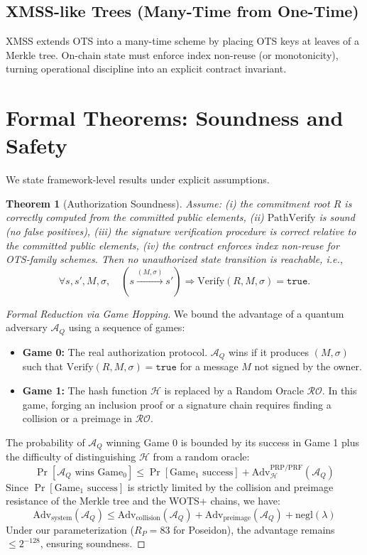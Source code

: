 \documentclass[conference]{IEEEtran}
\theoremstyle{definition}
\theoremstyle{plain}
\newtheorem{theorem}{Theorem}
\theoremstyle{remark}
\newcommand{\negl}{\mathrm{negl}}
\newcommand{\Verify}{\mathrm{Verify}}
\newcommand{\PathVerify}{\mathrm{PathVerify}}
\newcommand{\Hash}{\mathcal{H}}
\begin{document}
\subsection{XMSS-like Trees (Many-Time from One-Time)}
XMSS extends OTS into a many-time scheme by placing OTS keys at leaves of a Merkle tree. On-chain state must enforce index non-reuse (or monotonicity), turning operational discipline into an explicit contract invariant.

\section{Formal Theorems: Soundness and Safety}
We state framework-level results under explicit assumptions.

\begin{theorem}[Authorization Soundness]
\label{thm:soundness}
Assume:
(i) the commitment root $R$ is correctly computed from the committed public elements,
(ii) $\PathVerify$ is sound (no false positives),
(iii) the signature verification procedure is correct relative to the committed public elements,
(iv) the contract enforces index non-reuse for OTS-family schemes.
Then no unauthorized state transition is reachable, i.e.,
\[
\forall s,s',M,\sigma,\quad \left(s \xrightarrow{(M,\sigma)} s'\right)\Rightarrow \Verify(R,M,\sigma)=\texttt{true}.
\]
\end{theorem}

\begin{proof}[Formal Reduction via Game Hopping]
We bound the advantage of a quantum adversary $\mathcal{A}_Q$ using a sequence of games:
\begin{itemize}
    \item \textbf{Game 0:} The real authorization protocol. $\mathcal{A}_Q$ wins if it produces $(M, \sigma)$ such that $\Verify(R, M, \sigma) = \texttt{true}$ for a message $M$ not signed by the owner.
    \item \textbf{Game 1:} The hash function $\Hash$ is replaced by a Random Oracle $\mathcal{RO}$. In this game, forging an inclusion proof or a signature chain requires finding a collision or a preimage in $\mathcal{RO}$.
\end{itemize}
The probability of $\mathcal{A}_Q$ winning Game 0 is bounded by its success in Game 1 plus the difficulty of distinguishing $\Hash$ from a random oracle:
\[
\Pr[\mathcal{A}_Q \text{ wins } \text{Game}_0] \leq \Pr[\text{Game}_1 \text{ success}] + \text{Adv}_{\Hash}^{\text{PRP/PRF}}(\mathcal{A}_Q)
\]
Since $\Pr[\text{Game}_1 \text{ success}]$ is strictly limited by the collision and preimage resistance of the Merkle tree and the WOTS+ chains, we have:
\[
\text{Adv}_{\text{system}}(\mathcal{A}_Q) \leq \text{Adv}_{\text{collision}}(\mathcal{A}_Q) + \text{Adv}_{\text{preimage}}(\mathcal{A}_Q) + \negl(\lambda)
\]
Under our parameterization ($R_P=83$ for Poseidon), the advantage remains $\leq 2^{-128}$, ensuring soundness.
\end{proof}
\end{document}
